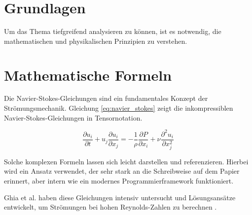 \section{Grundlagen}
\label{sec:grundlagen}

Um das Thema tiefgreifend analysieren zu können, ist es notwendig, die mathematischen und physikalischen Prinzipien zu verstehen.

\section{Mathematische Formeln}

Die Navier-Stokes-Gleichungen sind ein fundamentales Konzept der Strömungsmechanik. Gleichung \ref{eq:navier_stokes} zeigt die inkompressiblen Navier-Stokes-Gleichungen in Tensornotation.

\begin{equation}
\label{eq:navier_stokes}
\frac{\partial u_i}{\partial t} + u_j \frac{\partial u_i}{\partial x_j} = - \frac{1}{\rho} \frac{\partial P}{\partial x_i} + \nu \frac{\partial^2 u_i}{\partial x_j^2}
\end{equation}

Solche komplexen Formeln lassen sich leicht darstellen und referenzieren. Hierbei wird ein Ansatz verwendet, der sehr stark an die Schreibweise auf dem Papier erinnert, aber intern wie ein modernes Programmierframework funktioniert.

Ghia et al. haben diese Gleichungen intensiv untersucht und Lösungsansätze entwickelt, um Strömungen bei hohen Reynolds-Zahlen zu berechnen \cite{ghia_1982}.
